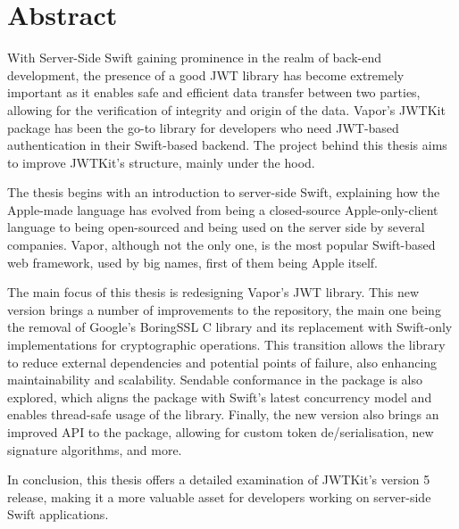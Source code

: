 \chapter*{Abstract}
With Server-Side Swift gaining prominence in the realm of back-end development, the presence of a good JWT library has become extremely important as it enables safe and efficient data transfer between two parties, allowing for the verification of integrity and origin of the data. Vapor's JWTKit package has been the go-to library for developers who need JWT-based authentication in their Swift-based backend. The project behind this thesis aims to improve JWTKit's structure, mainly under the hood.

The thesis begins with an introduction to server-side Swift, explaining how the Apple-made language has evolved from being a closed-source Apple-only-client language to being open-sourced and being used on the server side by several companies. Vapor, although not the only one, is the most popular Swift-based web framework, used by big names, first of them being Apple itself.

The main focus of this thesis is redesigning Vapor's JWT library. This new version brings a number of improvements to the repository, the main one being the removal of Google's BoringSSL C library and its replacement with Swift-only implementations for cryptographic operations. This transition allows the library to reduce external dependencies and potential points of failure, also enhancing maintainability and scalability. Sendable conformance in the package is also explored, which aligns the package with Swift's latest concurrency model and enables thread-safe usage of the library. Finally, the new version also brings an improved API to the package, allowing for custom token de/serialisation, new signature algorithms, and more.

In conclusion, this thesis offers a detailed examination of JWTKit's version 5 release, making it a more valuable asset for developers working on server-side Swift applications.